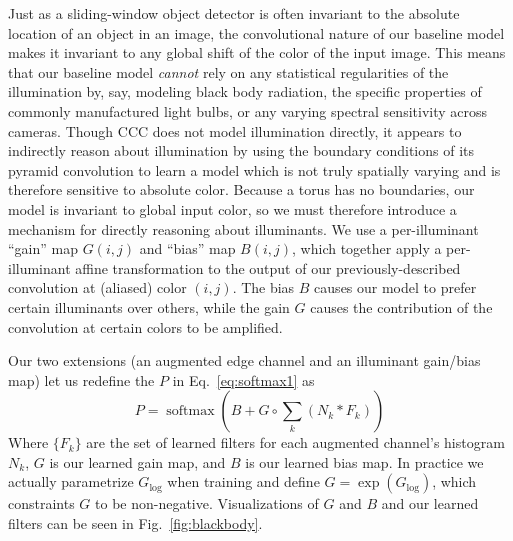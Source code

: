\documentclass[10pt,twocolumn,letterpaper]{article}
\begin{document}
Just as a sliding-window object detector is often invariant to the absolute location of an
object in an image,
the convolutional nature of our baseline model makes it invariant to any global shift of the color of the input image.
This means that our baseline model \emph{cannot} rely on any statistical
regularities of the illumination by, say,
modeling black body radiation,
the specific properties of commonly manufactured light bulbs,
or any varying spectral sensitivity across cameras.
Though CCC does not model illumination directly,
it appears to indirectly reason about illumination by using the boundary
conditions of its pyramid convolution to learn a model which is not truly
spatially varying and is therefore sensitive to absolute color.
Because a torus has no boundaries, our model is invariant to
global input color, so we must therefore
introduce a mechanism for directly reasoning about illuminants.
We use a per-illuminant ``gain'' map $G(i,j)$ and ``bias'' map $B(i,j)$,
which together apply a per-illuminant affine transformation to the output of our
previously-described convolution at (aliased) color $(i,j)$.
The bias $B$ causes our model
to prefer certain illuminants over others, while the gain $G$ causes the
contribution of the convolution at certain colors to be amplified.

Our two extensions (an augmented edge channel and an illuminant gain/bias map)
let us redefine the $P$ in Eq.~\ref{eq:softmax1} as
\begin{equation}
P = \operatorname{softmax} \left(B + G \circ \sum_k \left( N_k * F_k \right) \right)
\end{equation}
Where $\{F_k\}$ are the set of learned filters for each augmented channel's
histogram $N_k$,
$G$ is our learned gain map, and $B$ is our learned bias map.
In practice we actually parametrize $G_{\log}$ when training and define
$G = \exp(G_{\log})$, which constraints $G$ to be non-negative.
Visualizations of $G$ and $B$ and our learned filters can be seen in
Fig.~\ref{fig:blackbody}.
\end{document}
